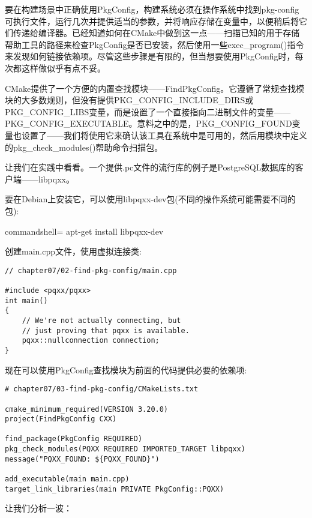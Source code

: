 要在构建场景中正确使用PkgConfig，构建系统必须在操作系统中找到pkg-config可执行文件，运行几次并提供适当的参数，并将响应存储在变量中，以便稍后将它们传递给编译器。已经知道如何在CMake中做到这一点——扫描已知的用于存储帮助工具的路径来检查PkgConfig是否已安装，然后使用一些exec\_program()指令来发现如何链接依赖项。尽管这些步骤是有限的，但当想要使用PkgConfig时，每次都这样做似乎有点不妥。

CMake提供了一个方便的内置查找模块——FindPkgConfig。它遵循了常规查找模块的大多数规则，但没有提供PKG\_CONFIG\_INCLUDE\_DIRS或PKG\_CONFIG\_LIBS变量，而是设置了一个直接指向二进制文件的变量——PKG\_CONFIG\_EXECUTABLE。意料之中的是，PKG\_CONFIG\_FOUND变量也设置了——我们将使用它来确认该工具在系统中是可用的，然后用模块中定义的pkg\_check\_modules()帮助命令扫描包。

让我们在实践中看看。一个提供.pc文件的流行库的例子是PostgreSQL数据库的客户端——libpqxx。

要在Debian上安装它，可以使用libpqxx-dev包(不同的操作系统可能需要不同的包):

\begin{tcblisting}{commandshell={}}
apt-get install libpqxx-dev
\end{tcblisting}

创建main.cpp文件，使用虚拟连接类:

\begin{lstlisting}[style=styleCXX]
// chapter07/02-find-pkg-config/main.cpp

#include <pqxx/pqxx>
int main()
{
	// We're not actually connecting, but
	// just proving that pqxx is available.
	pqxx::nullconnection connection;
}
\end{lstlisting} 

现在可以使用PkgConfig查找模块为前面的代码提供必要的依赖项:

\begin{lstlisting}[style=styleCMake]
# chapter07/03-find-pkg-config/CMakeLists.txt

cmake_minimum_required(VERSION 3.20.0)
project(FindPkgConfig CXX)

find_package(PkgConfig REQUIRED)
pkg_check_modules(PQXX REQUIRED IMPORTED_TARGET libpqxx)
message("PQXX_FOUND: ${PQXX_FOUND}")

add_executable(main main.cpp)
target_link_libraries(main PRIVATE PkgConfig::PQXX)
\end{lstlisting}

让我们分析一波：

